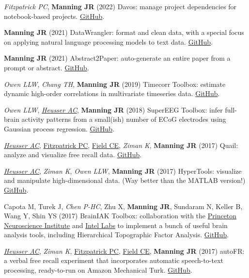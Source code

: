 \documentclass[11pt, a4paper]{article} %
\begin{document}
\begin{etaremune}
\item \textit{Fitzpatrick PC}, \textbf{Manning JR} (2022) Davos: manage project dependencies for notebook-based projects. \href{https://github.com/ContextLab/davos}{GitHub}.
\item \textbf{Manning JR} (2021) DataWrangler: format and clean data, with a special focus on applying natural language processing models to text data. \href{https://github.com/ContextLab/data-wrangler}{GitHub}.
\item \textbf{Manning JR} (2021) Abstract2Paper: auto-generate an entire paper from a prompt or abstract. \href{https://github.com/ContextLab/abstract2paper}{GitHub}.
\item \textit{Owen LLW}, \textit{Chang TH}, \textbf{Manning JR} (2019) Timecorr Toolbox: estimate dynamic high-order correlations in multivariate timeseries data. \href{https://github.com/ContextLab/timecorr}{GitHub}.
\item \textit{Owen LLW}, \ul{\textit{Heusser AC}}, \textbf{Manning JR} (2018) SuperEEG Toolbox: infer full-brain activity patterns from a small(ish) number of ECoG electrodes using Gaussian process regression. \href{https://github.com/ContextLab/supereeg}{GitHub}.
\item \ul{\textit{Heusser AC}}, \ul{Fitzpatrick PC}, \ul{Field CE}, \textit{Ziman K}, \textbf{Manning JR} (2017) Quail: analyze and visualize free recall data. \href{https://github.com/ContextLab/quail}{GitHub}.
\item \ul{\textit{Heusser AC}}, \textit{Ziman K}, \textit{Owen LLW}, \textbf{Manning JR} (2017) HyperTools: visualize and manipulate high-dimensional data. (Way better than the MATLAB version!) \href{https://github.com/ContextLab/hypertools}{GitHub}.
\item Capota M, Turek J, \textit{Chen P-HC}, Zhu X, \textbf{Manning JR}, Sundaram N, Keller B, Wang Y, Shin YS (2017) BrainIAK Toolbox: collaboration with the \href{https://pni.princeton.edu/}{Princeton Neuroscience Institute} and \href{http://www.intel.com/content/www/us/en/research/intel-research.html}{Intel Labs} to implement a bunch of useful brain analysis tools, including Hierarchical Topographic Factor Analysis. \href{https://github.com/IntelPNI/brainiak}{GitHub}.
\item \ul{\textit{Heusser AC}}, \textit{Ziman K}, \ul{Fitzpatrick PC}, \ul{Field CE}, \textbf{Manning JR} (2017) autoFR: a verbal free recall experiment that incorporates automatic speech-to-text processing, ready-to-run on Amazon Mechanical Turk. \href{https://github.com/ContextLab/autoFR}{GitHub}.

\end{etaremune}
\end{document}
